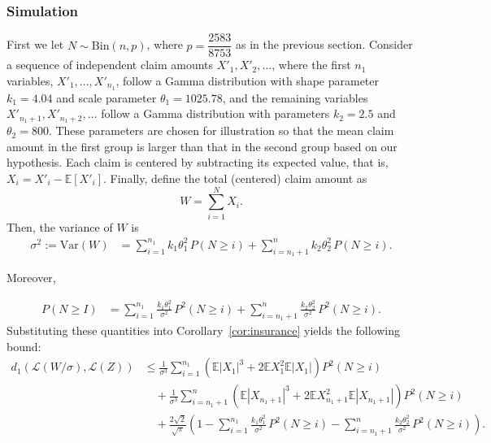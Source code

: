 \documentclass[pdflatex,sn-mathphys-ay]{sn-jnl}
\newcommand{\E}{\mathbb{E}}
\newcommand{\Var}{\mathrm{Var}}
\theoremstyle{thmstyleone}%
\theoremstyle{thmstyletwo}%
\theoremstyle{thmstylethree}%
\begin{document}
		
		\subsubsection{Simulation}   
        
		First we let \( N \sim \mathrm{Bin}(n, p) \), where \( p = \dfrac{2583}{8753} \) as in the previous section. Consider a sequence of independent claim amounts \( X'_1, X'_2, \ldots \), where the first $n_1$ variables, \( X'_1, \ldots, X'_{n_1} \), follow a Gamma distribution with shape parameter \( k_1 = 4.04 \) and scale parameter \( \theta_1 = 1025.78 \), and the remaining variables \( X'_{n_1+1}, X'_{n_1+2}, \ldots \) follow a Gamma distribution with parameters \( k_2 = 2.5 \) and \( \theta_2 = 800 \). These parameters are chosen for illustration so that the mean claim amount in the first group is larger than that in the second group based on our hypothesis. Each claim is centered by subtracting its expected value, that is, \( X_i = X'_i - \mathbb{E}[X'_i] \). Finally, define the total (centered) claim amount as
		\[
		W = \sum_{i=1}^N X_i.
		\]
		Then, the variance of \( W \) is
		\begin{align*}
			\sigma^2 := \Var(W) 
			&=  \sum_{i=1}^{n_{1}  } k_1\theta^2_1  \, P(N \ge i)+ \sum_{i={n_{1}+1}  }^n k_2\theta^2_2  \, P(N \ge i) .
		\end{align*}
		
		Moreover,
		
		\begin{align*}
			{P}(N \ge I) 
			&= \sum_{i=1}^{n_1}\frac{k_1\theta^2_1}{\sigma^2} \, {P}^2(N \ge i) +\sum_{i=n_1+1}^{n}\frac{k_2\theta^2_2}{\sigma^2} \, {P}^2(N \ge i).
		\end{align*}
Substituting these quantities into Corollary~\ref{cor:insurance} yields the following  bound:
			\begin{align}
				d_1\left(\mathcal{L}(W/\sigma), \mathcal{L}(Z) \right)
				&\le \frac{1}{\sigma^3}\sum_{i=1}^{n_{1}} \left(\E|X_1|^3 + 2\E X_1^2 \E|X_1|\right) P^2(N \ge i) \nonumber\\
				&\quad + \frac{1}{\sigma^3} \sum_{i=n_{1}+1}^{n} \left(\E|X_{n_{1}+1}|^3 + 2\E X_{n_{1}+1}^2  \E|X_{n_{1}+1}|\right) P^2(N \ge i)\nonumber \\
				&\quad + \frac{2\sqrt{2}}{\sqrt{\pi}} \left(1 - \sum_{i=1}^{n_1}\frac{k_1\theta^2_1}{\sigma^2} \, {P}^2(N \ge i) -\sum_{i=n_1+1}^{n}\frac{k_2\theta^2_2}{\sigma^2} \, {P}^2(N \ge i)\right). \label{eqn:two population}
			\end{align}
            
\end{document}
